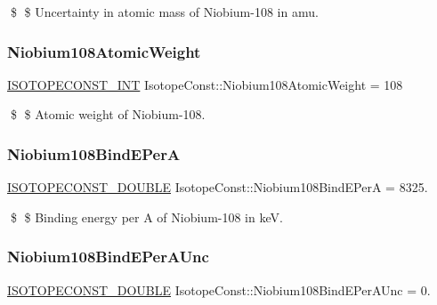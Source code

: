 \$ \$ Uncertainty in atomic mass of Niobium-\/108 in amu. \mbox{\label{group___isotope_const-_niobium-_nb108_ga152f53c33718aa860f5acb3443edd3d3}} 
\subsubsection{\texorpdfstring{Niobium108\+Atomic\+Weight}{Niobium108AtomicWeight}}
{\footnotesize\ttfamily \mbox{\hyperlink{group___isotope_const-_macros_ga5f18360b3e99483a35c32d789e62621c}{I\+S\+O\+T\+O\+P\+E\+C\+O\+N\+S\+T\+\_\+\+I\+NT}} Isotope\+Const\+::\+Niobium108\+Atomic\+Weight = 108}

\$ \$ Atomic weight of Niobium-\/108. \mbox{\label{group___isotope_const-_niobium-_nb108_gad8cb7fed4bd6c3e940a330ea9d121997}} 
\subsubsection{\texorpdfstring{Niobium108\+Bind\+E\+PerA}{Niobium108BindEPerA}}
{\footnotesize\ttfamily \mbox{\hyperlink{group___isotope_const-_macros_ga8f45a7272ce02c0b4c65c44636ed719a}{I\+S\+O\+T\+O\+P\+E\+C\+O\+N\+S\+T\+\_\+\+D\+O\+U\+B\+LE}} Isotope\+Const\+::\+Niobium108\+Bind\+E\+PerA = 8325.}

\$ \$ Binding energy per A of Niobium-\/108 in keV. \mbox{\label{group___isotope_const-_niobium-_nb108_ga70f0234509309ac8fdeda46388f44263}} 
\subsubsection{\texorpdfstring{Niobium108\+Bind\+E\+Per\+A\+Unc}{Niobium108BindEPerAUnc}}
{\footnotesize\ttfamily \mbox{\hyperlink{group___isotope_const-_macros_ga8f45a7272ce02c0b4c65c44636ed719a}{I\+S\+O\+T\+O\+P\+E\+C\+O\+N\+S\+T\+\_\+\+D\+O\+U\+B\+LE}} Isotope\+Const\+::\+Niobium108\+Bind\+E\+Per\+A\+Unc = 0.}

